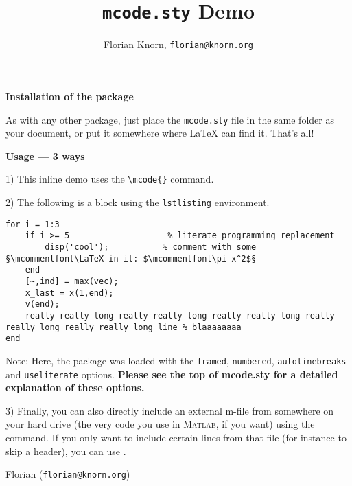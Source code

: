 \documentclass{article}
\title{\texttt{mcode.sty} Demo}
\author{Florian Knorn, \texttt{florian@knorn.org}}
\begin{document}
\maketitle

\textbf{Installation of the package}

As with any other package, just place the \verb|mcode.sty| file in the same folder as your document, or put it somewhere where \LaTeX{} can find it.  That's all!

\medskip

\textbf{Usage --- 3 ways}

1) This inline demo  uses the \verb|\mcode{}| command.

2) The following is a block using the \verb|lstlisting| environment.
\begin{lstlisting}
for i = 1:3
	if i >= 5                    % literate programming replacement
		disp('cool');           % comment with some §\mcommentfont\LaTeX in it: $\mcommentfont\pi x^2$§
	end
	[~,ind] = max(vec);
	x_last = x(1,end);
	v(end);
	really really long really really long really really long really really long really really long line % blaaaaaaaa
end
\end{lstlisting}
Note: Here, the package was loaded with the \verb|framed|, \verb|numbered|, \verb|autolinebreaks| and \verb|useliterate| options.  \textbf{Please see the top of mcode.sty for a detailed explanation of these options.}


3) Finally, you can also directly include an external m-file from somewhere on your hard drive (the very code you use in \textsc{Matlab}, if you want) using the \verb|| command.  If you only want to include certain lines from that file (for instance to skip a header), you can use \verb||.

\medskip


Florian (\texttt{florian@knorn.org})
\end{document}
